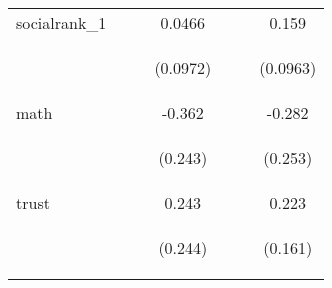 \begin{center}
\begin{tabular}{lcccccc}
socialrank\_1 &  &  & 0.0466 &  &  & 0.159 \\
\vspace{4pt} & \begin{footnotesize}\end{footnotesize} & \begin{footnotesize}\end{footnotesize} & \begin{footnotesize}(0.0972)\end{footnotesize} & \begin{footnotesize}\end{footnotesize} & \begin{footnotesize}\end{footnotesize} & \begin{footnotesize}(0.0963)\end{footnotesize} \\
math &  &  & -0.362 &  &  & -0.282 \\
\vspace{4pt} & \begin{footnotesize}\end{footnotesize} & \begin{footnotesize}\end{footnotesize} & \begin{footnotesize}(0.243)\end{footnotesize} & \begin{footnotesize}\end{footnotesize} & \begin{footnotesize}\end{footnotesize} & \begin{footnotesize}(0.253)\end{footnotesize} \\
trust &  &  & 0.243 &  &  & 0.223 \\
\vspace{4pt} & \begin{footnotesize}\end{footnotesize} & \begin{footnotesize}\end{footnotesize} & \begin{footnotesize}(0.244)\end{footnotesize} & \begin{footnotesize}\end{footnotesize} & \begin{footnotesize}\end{footnotesize} & \begin{footnotesize}(0.161)\end{footnotesize} \\

\end{tabular}
\end{center}
